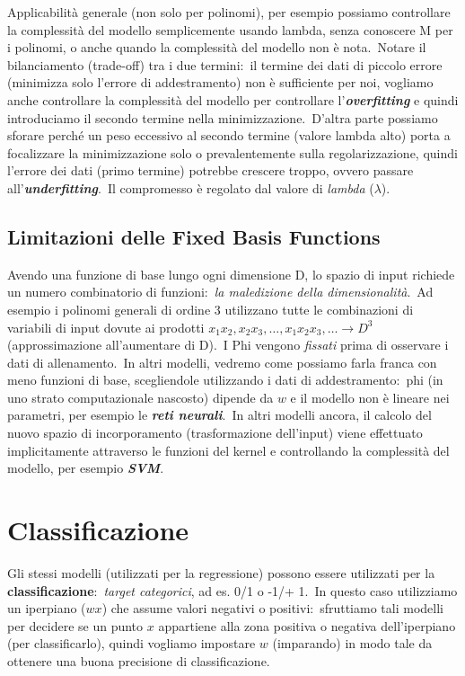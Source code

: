 Applicabilità generale (non solo per polinomi), per esempio possiamo controllare la complessità del modello semplicemente usando lambda, senza conoscere M per i polinomi, o anche quando la complessità del modello non è nota.\
Notare il bilanciamento (trade-off) tra i due termini:\
il termine dei dati di piccolo errore (minimizza solo l'errore di addestramento) non è sufficiente per noi, vogliamo anche controllare la complessità del modello per controllare l'\textbf{\textit{overfitting}} e quindi introduciamo il secondo termine nella minimizzazione.\
D'altra parte possiamo sforare perché un peso eccessivo al secondo termine (valore lambda alto) porta a focalizzare la minimizzazione solo o prevalentemente sulla regolarizzazione, quindi l'errore dei dati (primo termine) potrebbe crescere troppo, ovvero passare all'\textbf{\textit{underfitting}}.\
Il compromesso è regolato dal valore di \textit{lambda} ($\lambda$).\

\subsection{Limitazioni delle Fixed Basis Functions}

Avendo una funzione di base lungo ogni dimensione D, lo spazio di input richiede un numero combinatorio di funzioni:\ \textit{la maledizione della dimensionalità}.\
Ad esempio i polinomi generali di ordine 3 utilizzano tutte le combinazioni di variabili di input dovute ai prodotti $x_1 x_2, x_2 x_3, \dots, x_1 x_2 x_3, \dots \rightarrow D^3$ (approssimazione all'aumentare di D).\
I Phi vengono \textit{fissati} prima di osservare i dati di allenamento.\
In altri modelli, vedremo come possiamo farla franca con meno funzioni di base, scegliendole utilizzando i dati di addestramento:\ phi (in uno strato computazionale nascosto) dipende da $w$ e il modello non è lineare nei parametri, per esempio le \textbf{\textit{reti neurali}}.\
In altri modelli ancora, il calcolo del nuovo spazio di incorporamento (trasformazione dell'input) viene effettuato implicitamente attraverso le funzioni del kernel e controllando la complessità del modello, per esempio \textbf{\textit{SVM}}.\

\section{Classificazione}

Gli stessi modelli (utilizzati per la regressione) possono essere utilizzati per la \textbf{classificazione}:\ \textit{target categorici}, ad es. 0/1 o -1/+ 1.\
In questo caso utilizziamo un iperpiano ($wx$) che assume valori negativi o positivi:\ sfruttiamo tali modelli per decidere se un punto $x$ appartiene alla zona positiva o negativa dell'iperpiano (per classificarlo), quindi vogliamo impostare $w$ (imparando) in modo tale da ottenere una buona precisione di classificazione.\

